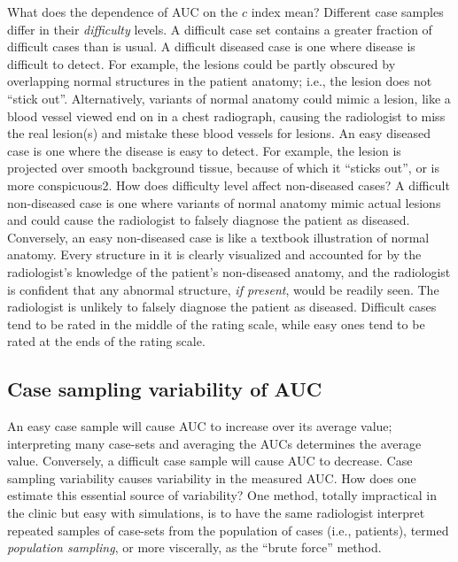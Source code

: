 \documentclass[
]{book}
\begin{document}
What does the dependence of AUC on the \(c\) index mean? Different case samples differ in their \emph{difficulty} levels. A difficult case set contains a greater fraction of difficult cases than is usual. A difficult diseased case is one where disease is difficult to detect. For example, the lesions could be partly obscured by overlapping normal structures in the patient anatomy; i.e., the lesion does not ``stick out''. Alternatively, variants of normal anatomy could mimic a lesion, like a blood vessel viewed end on in a chest radiograph, causing the radiologist to miss the real lesion(s) and mistake these blood vessels for lesions. An easy diseased case is one where the disease is easy to detect. For example, the lesion is projected over smooth background tissue, because of which it ``sticks out'', or is more conspicuous2. How does difficulty level affect non-diseased cases? A difficult non-diseased case is one where variants of normal anatomy mimic actual lesions and could cause the radiologist to falsely diagnose the patient as diseased. Conversely, an easy non-diseased case is like a textbook illustration of normal anatomy. Every structure in it is clearly visualized and accounted for by the radiologist's knowledge of the patient's non-diseased anatomy, and the radiologist is confident that any abnormal structure, \emph{if present}, would be readily seen. The radiologist is unlikely to falsely diagnose the patient as diseased. Difficult cases tend to be rated in the middle of the rating scale, while easy ones tend to be rated at the ends of the rating scale.

\hypertarget{case-sampling-variability-of-auc}{%
\subsection{Case sampling variability of AUC}\label{case-sampling-variability-of-auc}}

An easy case sample will cause AUC to increase over its average value; interpreting many case-sets and averaging the AUCs determines the average value. Conversely, a difficult case sample will cause AUC to decrease. Case sampling variability causes variability in the measured AUC. How does one estimate this essential source of variability? One method, totally impractical in the clinic but easy with simulations, is to have the same radiologist interpret repeated samples of case-sets from the population of cases (i.e., patients), termed \emph{population sampling}, or more viscerally, as the ``brute force'' method.
\end{document}
